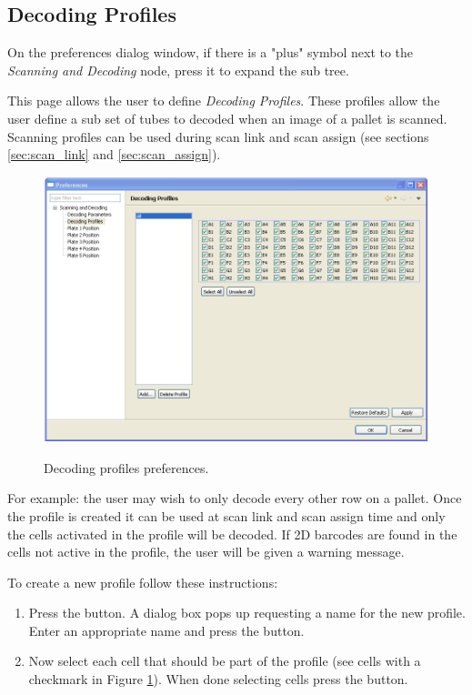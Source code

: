 \subsection{Decoding Profiles}
\label{sec:decoding_profiles}
On the preferences dialog window, if there is a "plus" symbol next to the
\emph{Scanning and Decoding} node, press it to expand the sub tree.

This page allows the user to define \emph{Decoding Profiles}. These profiles
allow the user define a sub set of tubes to decoded when an image of a pallet
is scanned. Scanning profiles can be used during scan link and scan assign (see
sections \ref{sec:scan_link} and \ref{sec:scan_assign}).
    \begin{figure}[H]
      \centering
      \scalebox{0.45}
      { \includegraphics*{screenshots/configuration/prefs_decoding_profiles} }
      \caption{Decoding profiles preferences.}
      \label{fig:prefs_decoding_profiles}
    \end{figure}
For example: the user may wish to only decode every other row on a pallet. Once
the profile is created it can be used at scan link and scan assign time and
only the cells activated in the profile will be decoded. If 2D barcodes are
found in the cells not active in the profile, the user will be given a warning
message.

To create a new profile follow these instructions:
\begin{enumerate}
  \item Press the  button. A dialog box pops up requesting a name
    for the new profile. Enter an appropriate name and press the 
    button.
  \item Now select each cell that should be part of the profile (see cells with
    a checkmark in Figure \ref{fig:prefs_decoding_profiles}). When done
    selecting cells press the  button.
\end{enumerate}

